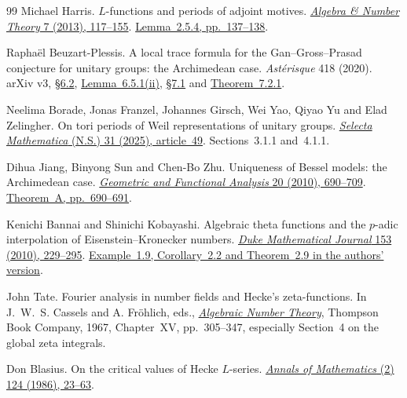 \begin{thebibliography}{99}
Michael Harris.
\(L\)-functions and periods of adjoint motives.
\href{https://doi.org/10.2140/ant.2013.7.117}
{\emph{Algebra \& Number Theory} 7 (2013), 117--155}.
\href{https://msp.org/ant/2013/7-1/ant-v7-n1-p05-p.pdf\#page=22}
{Lemma~2.5.4, pp.~137--138}.

Rapha\"el Beuzart-Plessis.
A local trace formula for the Gan--Gross--Prasad conjecture for
unitary groups: the Archimedean case.
\emph{Ast\'erisque} 418 (2020).
arXiv v3, \href{https://arxiv.org/pdf/1506.01452v3\#page=144}{\S6.2},
\href{https://arxiv.org/pdf/1506.01452v3\#page=154}{Lemma~6.5.1(ii)},
\href{https://arxiv.org/pdf/1506.01452v3\#page=177}{\S7.1} and
\href{https://arxiv.org/pdf/1506.01452v3\#page=181}{Theorem~7.2.1}.

Neelima Borade, Jonas Franzel, Johannes Girsch, Wei Yao, Qiyao Yu
and Elad Zelingher.
On tori periods of Weil representations of unitary groups.
\href{https://doi.org/10.1007/s00029-025-01047-4}
{\emph{Selecta Mathematica} (N.S.) 31 (2025), article~49}.
Sections~3.1.1 and~4.1.1.

Dihua Jiang, Binyong Sun and Chen-Bo Zhu.
Uniqueness of Bessel models: the Archimedean case.
\href{https://doi.org/10.1007/s00039-010-0077-4}
{\emph{Geometric and Functional Analysis} 20 (2010), 690--709}.
\href{https://bpb-us-w2.wpmucdn.com/blog.nus.edu.sg/dist/3/12136/files/2019/08/Author-copy-GAFA-Bessel-models.pdf\#page=2}
{Theorem~A, pp.~690--691}.

Kenichi Bannai and Shinichi Kobayashi.
Algebraic theta functions and the \(p\)-adic interpolation of
Eisenstein--Kronecker numbers.
\href{https://doi.org/10.1215/00127094-2010-024}
{\emph{Duke Mathematical Journal} 153 (2010), 229--295}.
\href{https://arxiv.org/pdf/math/0610163v4}
{Example~1.9, Corollary~2.2 and Theorem~2.9 in the authors' version}.

John Tate.
Fourier analysis in number fields and Hecke's zeta-functions.
In J.\ W.\ S. Cassels and A. Fr\"ohlich, eds.,
\href{https://www.math.ucsd.edu/~csorense/teaching/math205/Cassels-Frohlich-Algebraic_Number_Theory.pdf}
{\emph{Algebraic Number Theory}}, Thompson Book Company, 1967,
Chapter~XV, pp.~305--347, especially Section~4 on the global zeta integrals.

Don Blasius.
On the critical values of Hecke \(L\)-series.
\href{https://annals.math.princeton.edu/1986/124/p02}
{\emph{Annals of Mathematics} (2) 124 (1986), 23--63}.


\end{thebibliography}
